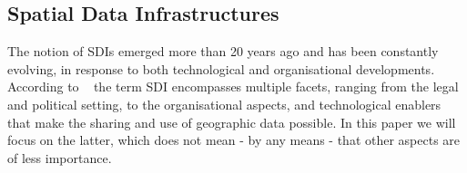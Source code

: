 \documentclass{isprs} %
\begin{document}








\subsection{Spatial Data Infrastructures}\label{sec:SDIS}

The notion of SDIs emerged more than 20 years ago and has been constantly evolving, in response to both technological and organisational developments.
According to ~\cite{kotsev2022} the term SDI encompasses multiple facets, ranging from the legal and political setting, to the organisational aspects, and technological enablers that make the sharing and use of geographic data possible. In this paper we will focus on the latter, which does not mean - by any means - that other aspects are of less importance.
\end{document}
